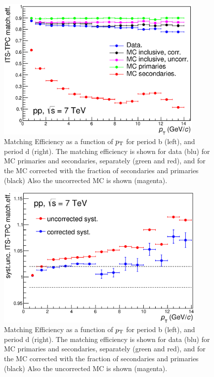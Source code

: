 \begin{figure}[!htb]
\begin{center}
\includegraphics[height=7cm]{FigCap4/ITSTPCmatchEff_10bpass4_vsPt.eps}
\caption{Matching Efficiency as a function of $p_{\rm T}$ for period b (left), and period d (right). The matching efficiency is shown for data (blu) for MC primaries and secondaries, separately (green and red), and for the MC corrected with the fraction of secondaries and primaries (black) Also the uncorrected MC is shown (magenta). }
\label{fig:CorrMatchEffVsPt}
\end{center}
\end{figure}

\begin{figure}[!htb]
\begin{center}
\includegraphics[height=7cm]{FigCap4/ITSTPCmatchEffSyst_10bpass4_vsPt.eps}
\caption{Matching Efficiency as a function of $p_{\rm T}$ for period b (left), and period d (right). The matching efficiency is shown for data (blu) for MC primaries and secondaries, separately (green and red), and for the MC corrected with the fraction of secondaries and primaries (black) Also the uncorrected MC is shown (magenta). }
\label{fig:CorrMatchEffVsPt}
\end{center}
\end{figure}


